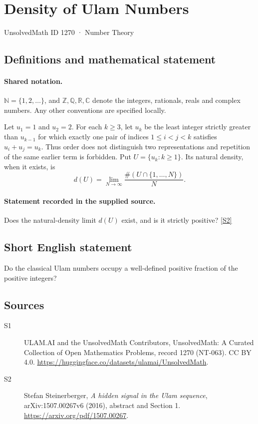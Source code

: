 \documentclass[11pt]{article}
\newcommand{\sref}[2]{\hyperlink{source:#1:#2}{[S#2]}}
\begin{document}
\setcounter{section}{1269}
\section{Density of Ulam Numbers}\label{1270}
{\small\sffamily UnsolvedMath ID 1270 · Number Theory}
\subsection{Definitions and mathematical statement}

\paragraph{Shared notation.}$\mathbb N=\{1,2,\ldots\}$, and $\mathbb Z,\mathbb Q,\mathbb R,\mathbb C$ denote the integers, rationals, reals and complex numbers. Any other conventions are specified locally.


Let $u_1=1$ and $u_2=2$. For each $k\geq3$, let $u_k$ be the least integer strictly greater than $u_{k-1}$ for which exactly one pair of indices $1\leq i<j<k$ satisfies $u_i+u_j=u_k$. Thus order does not distinguish two representations and repetition of the same earlier term is forbidden. Put $U=\{u_k:k\geq1\}$. Its natural density, when it exists, is
\[
d(U)=\lim_{N\to\infty}\frac{\#(U\cap\{1,\ldots,N\})}{N}.
\]
\paragraph{Statement recorded in the supplied source.}
Does the natural-density limit $d(U)$ exist, and is it strictly positive? \sref{1270}{2}

\subsection{Short English statement}
Do the classical Ulam numbers occupy a well-defined positive fraction of the positive integers?
\subsection{Sources}
\begin{description}
\item[\hypertarget{source:1270:1}{S1}] ULAM.AI and the UnsolvedMath Contributors, UnsolvedMath: A Curated Collection of Open Mathematics Problems, record 1270 (NT-063). CC BY 4.0. \url{https://huggingface.co/datasets/ulamai/UnsolvedMath}.
\item[\hypertarget{source:1270:2}{S2}] Stefan Steinerberger, \emph{A hidden signal in the Ulam sequence}, arXiv:1507.00267v6 (2016), abstract and Section 1. \url{https://arxiv.org/pdf/1507.00267}.
\end{description}
\label{end:1270}
\end{document}
